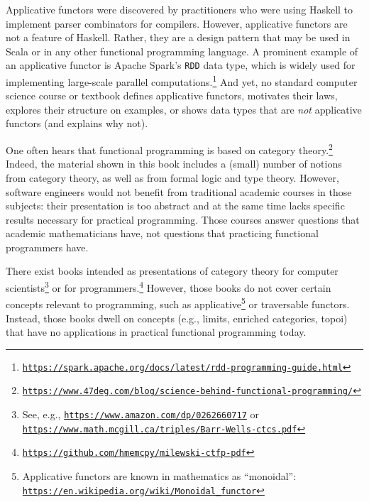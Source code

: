 Applicative functors were discovered by practitioners who were using
Haskell to implement parser combinators for compilers. However, applicative
functors are not a feature of Haskell. Rather, they are a design pattern
that may be used in Scala or in any other functional programming language.
A prominent example of an applicative functor is Apache Spark\textsf{'}s \lstinline!RDD!
data type, which is widely used for implementing large-scale parallel
computations.\footnote{\texttt{\href{https://spark.apache.org/docs/latest/rdd-programming-guide.html}{https://spark.apache.org/docs/latest/rdd-programming-guide.html}}}
And yet, no standard computer science course or textbook defines applicative
functors, motivates their laws, explores their structure on examples,
or shows data types that are \emph{not} applicative functors (and
explains why not). 


One often hears that functional programming is based on category theory.\footnote{\texttt{\href{https://www.47deg.com/blog/science-behind-functional-programming/}{https://www.47deg.com/blog/science-behind-functional-programming/}}}
Indeed, the material shown in this book includes a (small) number
of notions from category theory, as well as from formal logic and
type theory. However, software engineers would not benefit from traditional
academic courses in those subjects: their presentation is too abstract
and at the same time lacks specific results necessary for practical
programming. Those courses answer questions that academic mathematicians
have, not questions that practicing functional programmers have.

There exist books intended as presentations of category theory for
computer scientists\footnote{See, e.g., \texttt{\href{https://www.amazon.com/dp/0262660717}{https://www.amazon.com/dp/0262660717}}
or \texttt{\href{https://www.math.mcgill.ca/triples/Barr-Wells-ctcs.pdf}{https://www.math.mcgill.ca/triples/Barr-Wells-ctcs.pdf}}} or for programmers.\footnote{\texttt{\href{https://github.com/hmemcpy/milewski-ctfp-pdf}{https://github.com/hmemcpy/milewski-ctfp-pdf}}}
However, those books do not cover certain concepts relevant to programming,
such as applicative\footnote{Applicative functors are known in mathematics as \textsf{``}monoidal\textsf{''}: \texttt{\href{https://en.wikipedia.org/wiki/Monoidal_functor}{https://en.wikipedia.org/wiki/Monoidal\_functor}}}
or traversable functors. Instead, those books dwell on concepts (e.g.,
limits, enriched categories, topoi) that have no applications in practical
functional programming today.

